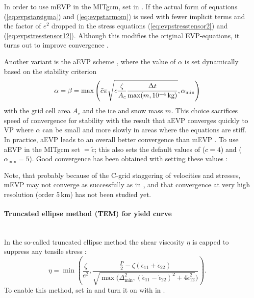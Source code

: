 In order to use mEVP in the MITgcm, set  in . If 
the actual form of equations (\ref{eq:evpstarsigma}) and
(\ref{eq:evpstarmom}) is used with fewer implicit terms and the factor
of $e^{2}$ dropped in the stress equations (\ref{eq:evpstresstensor2})
and (\ref{eq:evpstresstensor12}). Although this modifies the original
EVP-equations, it turns out to improve convergence \citep{bouillon13}.

Another variant is the aEVP scheme \citep{kimmritz16}, where the value
of $\alpha$ is set dynamically based on the stability criterion
\begin{equation}
  \label{eq:aevpalpha}
  \alpha = \beta = \max\left( \tilde{c}\pi\sqrt{c \frac{\zeta}{A_{c}}
    \frac{\Delta{t}}{\max(m,10^{-4}\text{\,kg})}},\alpha_{\min} \right)
\end{equation}
with the grid cell area $A_c$ and the ice and snow mass $m$.  This
choice sacrifices speed of convergence for stability with the result
that aEVP converges quickly to VP where $\alpha$ can be small and more
slowly in areas where the equations are stiff. In practice, aEVP leads
to an overall better convergence than mEVP \citep{kimmritz16}.
% 
To use aEVP in the MITgcm set  $= \tilde{c}$;
this also sets the default values of  ($c=4$)
and  ($\alpha_{\min}=5$). Good convergence
has been obtained with setting these values \citep{kimmritz16}:

Note, that probably because of the C-grid staggering of velocities and
stresses, mEVP may not converge as successfully as in
\citet{kimmritz15}, and that convergence at very high resolution
(order 5\,km) has not been studied yet.

\paragraph{Truncated ellipse method (TEM) for yield curve \label{sec:pkg:seaice:TEM}}~\\
%
In the so-called truncated ellipse method the shear viscosity $\eta$
is capped to suppress any tensile stress \citep{hibler97, geiger98}:
\begin{equation}
  \label{eq:etatem}
  \eta = \min\left(\frac{\zeta}{e^2},
  \frac{\frac{P}{2}-\zeta(\dot{\epsilon}_{11}+\dot{\epsilon}_{22})}
  {\sqrt{\max(\Delta_{\min}^{2},(\dot{\epsilon}_{11}-\dot{\epsilon}_{22})^2
      +4\dot{\epsilon}_{12}^2})}\right).
\end{equation}
To enable this method, set  in
 and turn it on with
 in . 


